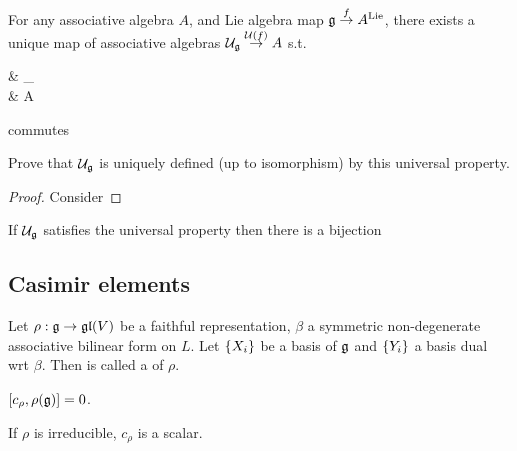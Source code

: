 \documentclass{article}
\begin{document}
\begin{prop}
	For any associative algebra $A$, and Lie algebra map $\mf{g} \overset{f}{\to} A^{\text{Lie}}$, there exists a unique map of associative algebras $\mc{U}_\mf{g} \overset{\mc{U}(f)}{\to} A$ s.t. 
	\begin{tkz}
		& _ \arrow[d,"\mc{U}(f)"] \\
		 \arrow[ur,"\iota"] \arrow[r,"f"] & A
	\end{tkz}
	commutes
\end{prop}

\begin{ex}
	Prove that $\mc{U}_\mf{g}$ is uniquely defined (up to isomorphism) by this universal property. 
\end{ex}
\begin{proof}
	Consider
\end{proof}

\begin{prop}
	If $\mc{U}_\mf{g}$ satisfies the universal property then there is a bijection 
\end{prop}

\subsection{Casimir elements}

\begin{definition}
	Let $\rho:\mf{g} \to \mf{gl}(V)$ be a faithful representation, $\beta$ a symmetric non-degenerate associative bilinear form on $L$. Let $\pbrace{X_i}$ be a basis of $\mf{g}$ and $\pbrace{Y_i}$ a basis dual wrt $\beta$. Then 
is called a  of $\rho$. 
\end{definition}

\begin{prop}
	$\comm[c_\rho]{\rho(\mf{g})}=0$. 
\end{prop}

\begin{corollary}
	If $\rho$ is irreducible, $c_\rho$ is a scalar.
\end{corollary}

\end{document}
